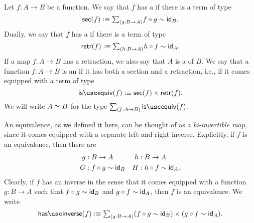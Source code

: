 \begin{defn}
Let $f:A\to B$ be a function. We say that $f$ has a  if there is a term of type
\begin{equation*}
\sections(f) \defeq \sm{g:B\to A} f\circ g\htpy \idfunc[B].
\end{equation*}
Dually, we say that $f$ has a  if there is a term of type
\begin{equation*}
\retractions(f) \defeq \sm{h:B\to A} h\circ f\htpy \idfunc[A].
\end{equation*}
If a map $f:A \to B$ has a retraction, we also say that $A$ is a  of $B$.
We say that a function $f:A\to B$ is an  if it has both a section and a retraction, i.e., if it comes equipped with a term of type
\begin{equation*}
\isequiv(f)\defeq\sections(f)\times\retractions(f).
\end{equation*}
We will write $\eqv{A}{B}$ for the type $\sm{f:A\to B}\isequiv(f)$.
\end{defn}

\begin{rmk}
An equivalence, as we defined it here, can be thought of as a \emph{bi-invertible map}, since it comes equipped with a separate left and right inverse. Explicitly, if $f$ is an equivalence, then there are
\begin{align*}
g & : B\to A & h & : B\to A \\
G & : f\circ g \htpy \idfunc[B] & H & : h\circ f \htpy \idfunc[A].
\end{align*}
Clearly, if $f$ has an inverse in the sense that it comes equipped with a function $g:B\to A$ such that $f\circ g\htpy\idfunc[B]$ and $g\circ f\htpy\idfunc[A]$, then $f$ is an equivalence. We write
\begin{equation*}
\hasinverse(f)\defeq\sm{g:B\to A} (f\circ g\htpy \idfunc[B])\times (g\circ f\htpy\idfunc[A]).
\end{equation*}
\end{rmk}

